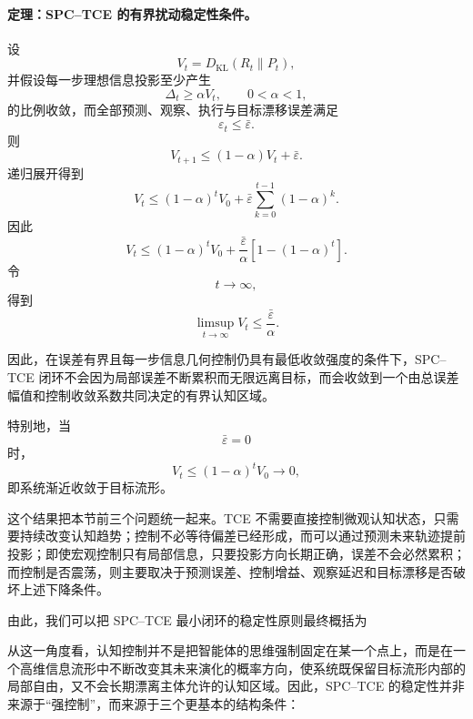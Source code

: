 \paragraph{定理：SPC--TCE 的有界扰动稳定性条件。}

设
\[
V_t
=
D_{\mathrm{KL}}
\left(
R_t\|P_t
\right),
\]
并假设每一步理想信息投影至少产生
\[
\Delta_t\ge \alpha V_t,
\qquad
0<\alpha<1,
\]
的比例收敛，而全部预测、观察、执行与目标漂移误差满足
\[
\varepsilon_t\le\bar\varepsilon.
\]
则
\[
V_{t+1}
\le
(1-\alpha)V_t
+
\bar\varepsilon.
\]
递归展开得到
\[
V_t
\le
(1-\alpha)^tV_0
+
\bar\varepsilon
\sum_{k=0}^{t-1}
(1-\alpha)^k.
\]
因此
\[
V_t
\le
(1-\alpha)^tV_0
+
\frac{\bar\varepsilon}{\alpha}
\left[
1-(1-\alpha)^t
\right].
\]
令
\[
t\rightarrow\infty,
\]
得到
\[
\boxed{
\limsup_{t\rightarrow\infty}
V_t
\le
\frac{\bar\varepsilon}{\alpha}.
}
\label{eq:spc-tce-practical-stability}
\]

因此，在误差有界且每一步信息几何控制仍具有最低收敛强度的条件下，SPC--TCE 闭环不会因为局部误差不断累积而无限远离目标，而会收敛到一个由总误差幅值和控制收敛系数共同决定的有界认知区域。

特别地，当
\[
\bar\varepsilon=0
\]
时，
\[
V_t
\le
(1-\alpha)^tV_0
\rightarrow0,
\]
即系统渐近收敛于目标流形。

这个结果把本节前三个问题统一起来。TCE 不需要直接控制微观认知状态，只需要持续改变认知趋势；控制不必等待偏差已经形成，而可以通过预测未来轨迹提前投影；即使宏观控制只有局部信息，只要投影方向长期正确，误差不会必然累积；而控制是否震荡，则主要取决于预测误差、控制增益、观察延迟和目标漂移是否破坏上述下降条件。

由此，我们可以把 SPC--TCE 最小闭环的稳定性原则最终概括为
\begin{statementbox}
\centering
{}
\end{statementbox}

从这一角度看，认知控制并不是把智能体的思维强制固定在某一个点上，而是在一个高维信息流形中不断改变其未来演化的概率方向，使系统既保留目标流形内部的局部自由，又不会长期漂离主体允许的认知区域。因此，SPC--TCE 的稳定性并非来源于``强控制''，而来源于三个更基本的结构条件：
\begin{statementbox}
\centering
{}
\end{statementbox}

